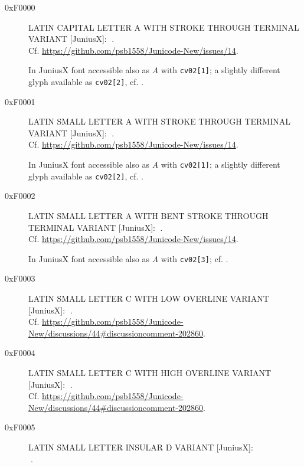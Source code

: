 \documentclass{mwart}
\newcommand{\Jglyph}[1]{{\relsize{2}\J#1}}
\begin{document}
\begin{description}
\item[0xF0000] LATIN CAPITAL LETTER A WITH STROKE THROUGH TERMINAL
  VARIANT [JuniusX]: \Jglyph{󰀀}.\\
  Cf. \url{https://github.com/psb1558/Junicode-New/issues/14}.
  
  In JuniusX font accessible also as \textit{A} with \texttt{cv02[1]};
  a slightly different glyph available as \texttt{cv02[2]},
  cf. \autocite[p. 7]{baker20:_opent_featur_junius_junius}.
% 

\item [0xF0001] LATIN SMALL LETTER A WITH STROKE THROUGH TERMINAL VARIANT [JuniusX]: 
  \Jglyph{󰀁}.\\ Cf. \url{https://github.com/psb1558/Junicode-New/issues/14}.

  In JuniusX font accessible also as \textit{A} with \texttt{cv02[1]};
  a slightly different glyph available as \texttt{cv02[2]},
  cf. \autocite[p. 7]{baker20:_opent_featur_junius_junius}.


\item [0xF0002] LATIN SMALL LETTER A WITH BENT STROKE THROUGH TERMINAL VARIANT [JuniusX]: 
  \Jglyph{󰀂}.\\ Cf. \url{https://github.com/psb1558/Junicode-New/issues/14}.

  In JuniusX font accessible also as \textit{A} with \texttt{cv02[3]};
  cf. \autocite[p. 7]{baker20:_opent_featur_junius_junius}.


\item [0xF0003] LATIN SMALL LETTER C WITH LOW OVERLINE VARIANT [JuniusX]: 
  \Jglyph{󰀃}.\\ Cf. \url{https://github.com/psb1558/Junicode-New/discussions/44#discussioncomment-202860}.
\item [0xF0004] LATIN SMALL LETTER C WITH HIGH OVERLINE VARIANT [JuniusX]: 
  \Jglyph{󰀄}.\\ Cf. \url{https://github.com/psb1558/Junicode-New/discussions/44#discussioncomment-202860}.
\item [0xF0005] LATIN SMALL LETTER INSULAR D VARIANT [JuniusX]:\\
  \Jglyph{󰀅}.%


\end{description}
\end{document}
